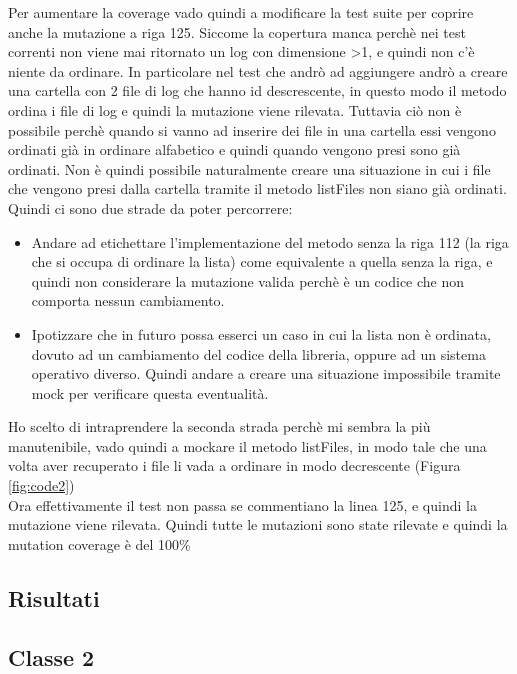 \documentclass[12pt, a4paper]{article}
\begin{document}
Per aumentare la coverage vado quindi a modificare la test suite per coprire anche la mutazione a riga 125.
Siccome la copertura manca perchè nei test correnti non viene mai ritornato un log con dimensione >1, e 
quindi non c'è niente da ordinare. In particolare nel test che andrò ad aggiungere andrò a creare una cartella con 2 file
di log che hanno id descrescente, in questo modo il metodo ordina i file di log e quindi la mutazione viene rilevata.
Tuttavia ciò non è possibile perchè quando si vanno ad inserire dei file in una cartella essi vengono ordinati già in ordinare
alfabetico e quindi quando vengono presi sono già ordinati. Non è quindi possibile naturalmente creare una situazione 
in cui i file che vengono presi dalla cartella tramite il metodo listFiles\(\) non siano già ordinati. \\
Quindi ci sono due strade da poter percorrere:
\begin{itemize}
  \item Andare ad etichettare l'implementazione del metodo senza la riga 112 (la riga che si occupa di ordinare la lista) 
  come equivalente a quella senza la riga, e quindi non considerare la mutazione valida perchè è un codice che non
  comporta nessun cambiamento.
  \item Ipotizzare che in futuro possa esserci un caso in cui la lista non è ordinata, dovuto ad un cambiamento del codice
  della libreria, oppure ad un sistema operativo diverso. Quindi andare a creare una situazione impossibile tramite mock per
  verificare questa eventualità.
\end{itemize}

Ho scelto di intraprendere la seconda strada perchè mi sembra la più manutenibile, vado quindi a mockare 
il metodo listFiles\(\), in modo tale che una volta aver recuperato i file li vada a 
ordinare in modo decrescente (Figura \ref{fig:code2}) \\

Ora effettivamente il test non passa se commentiano la linea 125, e quindi la mutazione viene rilevata.
Quindi tutte le mutazioni sono state rilevate e quindi la mutation coverage è del 100\% 

\subsection{Risultati}


  



\subsection{Classe 2}
\end{document}
